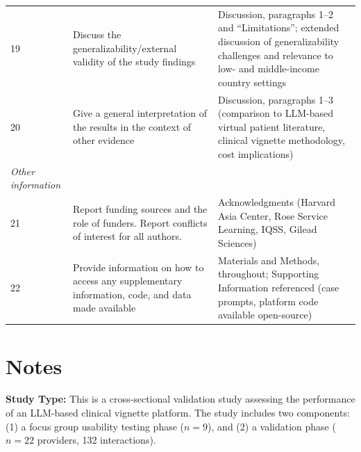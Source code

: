 \documentclass{article}
\begin{document}
\begin{table}[h]
\begin{tabular}{p{}p{}p{}}
19 & Discuss the generalizability/external validity of the study findings & Discussion, paragraphs 1--2 and ``Limitations''; extended discussion of generalizability challenges and relevance to low- and middle-income country settings \\

20 & Give a general interpretation of the results in the context of other evidence & Discussion, paragraphs 1--3 (comparison to LLM-based virtual patient literature, clinical vignette methodology, cost implications) \\

\midrule
\textit{Other information} & & \\
\midrule

21 & Report funding sources and the role of funders. Report conflicts of interest for all authors. & Acknowledgments (Harvard Asia Center, Rose Service Learning, IQSS, Gilead Sciences) \\

22 & Provide information on how to access any supplementary information, code, and data made available & Materials and Methods, throughout; Supporting Information referenced (case prompts, platform code available open-source) \\

\bottomrule
\end{tabular}
\end{table}

\vspace{24pt}

\section*{Notes}

\noindent \textbf{Study Type:} This is a cross-sectional validation study assessing the performance of an LLM-based clinical vignette platform. The study includes two components: (1) a focus group usability testing phase ($n=9$), and (2) a validation phase ($n=22$ providers, 132 interactions).

\vspace{12pt}
\end{document}
